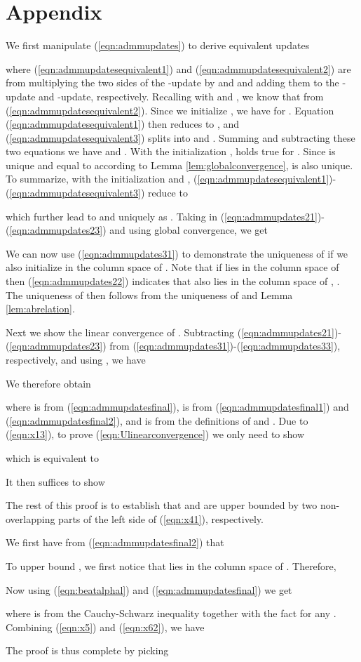 \documentclass[journal]{IEEEtran}
\begin{document}
\section*{Appendix}
\begin{IEEEproof} We first manipulate (\ref{eqn:admmupdates}) to derive equivalent updates 

where (\ref{eqn:admmupdatesequivalent1}) and (\ref{eqn:admmupdatesequivalent2}) are from multiplying the two sides of the -update by  and  and adding them to the -update and -update, respectively. Recalling  with  and , we know that  from (\ref{eqn:admmupdatesequivalent2}). Since we initialize , we have  for . Equation (\ref{eqn:admmupdatesequivalent1}) then reduces to , and (\ref{eqn:admmupdatesequivalent3}) splits into  and . Summing and subtracting these two equations we have  and . With the initialization ,  holds true for . Since  is unique and equal to  according to Lemma \ref{lem:globalconvergence},  is also unique. To summarize, with the initialization  and , (\ref{eqn:admmupdatesequivalent1})-(\ref{eqn:admmupdatesequivalent3}) reduce to 

which further lead to  and  uniquely as .
Taking  in (\ref{eqn:admmupdates21})-(\ref{eqn:admmupdates23}) and using global convergence, we get

We can now use (\ref{eqn:admmupdates31}) to demonstrate the uniqueness of  if we also initialize  in the column space of . Note that if  lies in the column space of  then (\ref{eqn:admmupdates22}) indicates that  also lies in the column space of , . The uniqueness of  then follows from the uniqueness of  and Lemma \ref{lem:abrelation}.

Next we show the linear convergence of . Subtracting (\ref{eqn:admmupdates21})-(\ref{eqn:admmupdates23}) from (\ref{eqn:admmupdates31})-(\ref{eqn:admmupdates33}), respectively, and using , we have

We therefore obtain 

where  is from (\ref{eqn:admmupdatesfinal}),  is from (\ref{eqn:admmupdatesfinal1}) and (\ref{eqn:admmupdatesfinal2}), and  is from the definitions of  and . Due to (\ref{eqn:x13}), to prove (\ref{eqn:Ulinearconvergence}) we only need to show

which is equivalent to 

It then suffices to show

The rest of this proof is to establish that  and  are upper bounded by two non-overlapping parts of the left side of (\ref{eqn:x41}), respectively.  

We first have from (\ref{eqn:admmupdatesfinal2}) that

To upper bound , we first notice that  lies in the column space of . Therefore, 

Now using (\ref{eqn:beatalphal}) and (\ref{eqn:admmupdatesfinal}) we get 

where  is from the Cauchy-Schwarz inequality together with the fact  for any .
Combining (\ref{eqn:x5}) and (\ref{eqn:x62}), we have 

The proof is thus complete by picking 

\end{IEEEproof}
\end{document}
